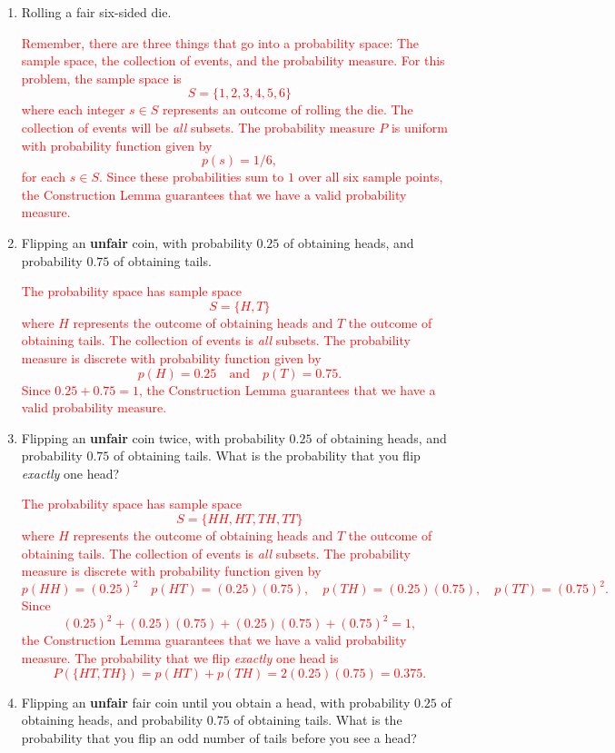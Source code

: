 \documentclass[12pt,reqno]{amsart}
\begin{document}
\medskip
\begin{enumerate}
\item Rolling a fair six-sided die.

\bigskip
\textcolor{red}{Remember, there are three things that go into a probability space: The sample space, the collection of events, and the probability measure. For this problem, the sample space is
	\[
	S = \{ 1, 2, 3, 4, 5, 6\}
	\]
where each integer $s\in S$ represents an outcome of rolling the die. The collection of events will be \textit{all} subsets. The probability measure $P$ is uniform with probability function given by
	\[
	p(s) = 1/6,
	\]
for each $s\in S$. Since these probabilities sum to $1$ over all six sample points, the Construction Lemma guarantees that we have a valid probability measure.}
\bigskip

\item Flipping an \textbf{unfair} coin, with probability $0.25$ of obtaining heads, and probability $0.75$ of obtaining tails.
    
\bigskip
\textcolor{red}{The probability space has sample space
	\[
	S = \{H,T\}
	\]
where $H$ represents the outcome of obtaining heads and $T$ the outcome of obtaining tails. The collection of events is \textit{all} subsets. The probability measure is discrete with probability function given by
	\[
	p(H) = 0.25 \quad \text{and} \quad p(T) = 0.75.
	\]
Since $0.25+0.75=1$, the Construction Lemma guarantees that we have a valid probability measure.}
\bigskip

\item Flipping an \textbf{unfair} coin twice, with probability $0.25$ of obtaining heads, and probability $0.75$ of obtaining tails. What is the probability that you flip \textit{exactly} one head?
    
\bigskip
\textcolor{red}{The probability space has sample space
	\[
	S = \{HH,HT, TH, TT\}
	\]
where $H$ represents the outcome of obtaining heads and $T$ the outcome of obtaining tails. The collection of events is \textit{all} subsets. The probability measure is discrete with probability function given by
	\[
	p(HH) = (0.25)^2 \quad p(HT) = (0.25)(0.75), \quad p(TH)= (0.25)(0.75), \quad p(TT) = (0.75)^2 .
	\]
Since
	\[
	(0.25)^2 + (0.25)(0.75) + (0.25)(0.75) + (0.75)^2 = 1,
	\]
the Construction Lemma guarantees that we have a valid probability measure. The probability that we flip \textit{exactly} one head is
	\[
	P(\{HT,TH\}) = p(HT) + p(TH) = 2(0.25)(0.75) = 0.375.
	\]}
\bigskip

\item Flipping an \textbf{unfair} fair coin until you obtain a head, with probability $0.25$ of obtaining heads, and probability $0.75$ of obtaining tails. What is the probability that you flip an odd number of tails before you see a head?
    

\end{enumerate}
\end{document}
